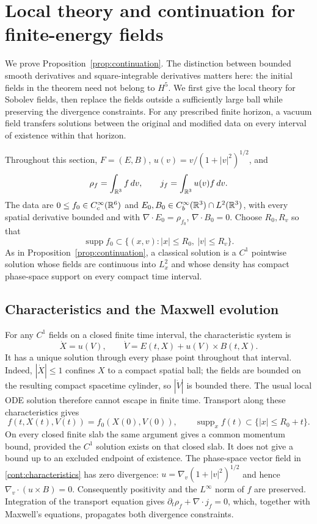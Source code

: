 \section{Local theory and continuation for finite-energy fields}
\label{sec:continuation-proof}

We prove Proposition~\ref{prop:continuation}.  The distinction between
bounded smooth derivatives and square-integrable derivatives matters here:
the initial fields in the theorem need not belong to $H^5$.
We first give the local theory for Sobolev fields, then replace the fields
outside a sufficiently large ball while preserving the divergence
constraints.  For any prescribed finite horizon, a vacuum field
transfers solutions between the original and modified data on every
interval of existence within that horizon.

Throughout this section, $F=(E,B)$,
$u(v)=v/(1+|v|^2)^{1/2}$, and
\[
 \rho_f=\int_{\mathbb R^3}f\,dv,
 \qquad j_f=\int_{\mathbb R^3}u(v)f\,dv.
\]
The data are $0\le f_0\in C_c^\infty(\mathbb R^6)$ and
$E_0,B_0\in C_b^\infty(\mathbb R^3)\cap L^2(\mathbb R^3)$, with every spatial
derivative bounded and with
$\nabla\cdot E_0=\rho_{f_0}$, $\nabla\cdot B_0=0$.
Choose $R_0,R_v$ so that
\[
 \operatorname{supp}f_0\subset
 \{(x,v):|x|\le R_0,\ |v|\le R_v\}.
\]
As in Proposition~\ref{prop:continuation}, a classical solution is a
$C^1$ pointwise solution whose fields are continuous into $L^2_x$ and whose
density has compact phase-space support on every compact time interval.

\subsection{Characteristics and the Maxwell evolution}

For any $C^1$ fields on a closed finite time interval, the characteristic
system is
\begin{equation}\label{cont:characteristics}
 \dot X=u(V),\qquad
 \dot V=E(t,X)+u(V)\times B(t,X).
\end{equation}
It has a unique solution through every phase point throughout that
interval.  Indeed, $|\dot X|\le1$ confines $X$ to a compact spatial ball;
the fields are bounded on the resulting compact spacetime cylinder, so
$|\dot V|$ is bounded there.  The usual local ODE solution therefore
cannot escape in finite time.  Transport along these characteristics gives
\begin{equation}\label{cont:spatial-support}
 f(t,X(t),V(t))=f_0(X(0),V(0)),\qquad
 \operatorname{supp}_x f(t)\subset\{|x|\le R_0+t\}.
\end{equation}
On every closed finite slab the same argument gives a common momentum
bound, provided the $C^1$ solution exists on that closed slab.  It does
not give a bound up to an excluded endpoint of existence.
The phase-space vector field in \eqref{cont:characteristics} has zero
divergence: $u=\nabla_v(1+|v|^2)^{1/2}$ and hence
$\nabla_v\cdot(u\times B)=0$.
Consequently positivity and the $L^\infty$ norm of $f$ are preserved.
Integration of the transport equation gives
$\partial_t\rho_f+\nabla\cdot j_f=0$, which, together with Maxwell's
equations, propagates both divergence constraints.

